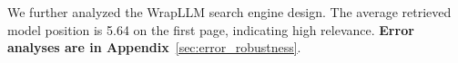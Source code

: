 
We further analyzed the WrapLLM search engine design. The average retrieved model position is 5.64 on the first page, indicating high relevance. \textbf{Error analyses are in Appendix}~\ref{sec:error_robustness}.

